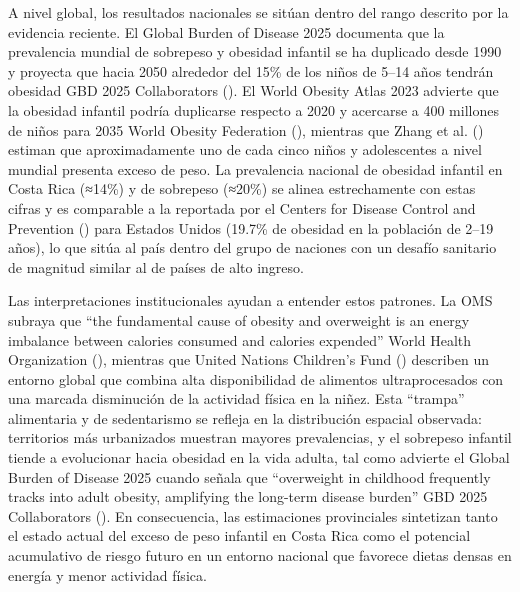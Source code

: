 \documentclass[
]{article}
\begin{document}
A nivel global, los resultados nacionales se sitúan dentro del rango
descrito por la evidencia reciente. El Global Burden of Disease 2025
documenta que la prevalencia mundial de sobrepeso y obesidad infantil se
ha duplicado desde 1990 y proyecta que hacia 2050 alrededor del 15\% de
los niños de 5--14 años tendrán obesidad GBD 2025 Collaborators
(). El World Obesity Atlas 2023 advierte que
la obesidad infantil podría duplicarse respecto a 2020 y acercarse a 400
millones de niños para 2035 World Obesity Federation
(), mientras que Zhang et al.
() estiman que aproximadamente uno de cada
cinco niños y adolescentes a nivel mundial presenta exceso de peso. La
prevalencia nacional de obesidad infantil en Costa Rica (≈14\%) y de
sobrepeso (≈20\%) se alinea estrechamente con estas cifras y es
comparable a la reportada por el Centers for Disease Control and
Prevention () para Estados Unidos (19.7\% de
obesidad en la población de 2--19 años), lo que sitúa al país dentro del
grupo de naciones con un desafío sanitario de magnitud similar al de
países de alto ingreso.

Las interpretaciones institucionales ayudan a entender estos patrones.
La OMS subraya que ``the fundamental cause of obesity and overweight is
an energy imbalance between calories consumed and calories expended''
World Health Organization (), mientras que
United Nations Children's Fund ()
describen un entorno global que combina alta disponibilidad de alimentos
ultraprocesados con una marcada disminución de la actividad física en la
niñez. Esta ``trampa'' alimentaria y de sedentarismo se refleja en la
distribución espacial observada: territorios más urbanizados muestran
mayores prevalencias, y el sobrepeso infantil tiende a evolucionar hacia
obesidad en la vida adulta, tal como advierte el Global Burden of
Disease 2025 cuando señala que ``overweight in childhood frequently
tracks into adult obesity, amplifying the long-term disease burden'' GBD
2025 Collaborators (). En consecuencia, las
estimaciones provinciales sintetizan tanto el estado actual del exceso
de peso infantil en Costa Rica como el potencial acumulativo de riesgo
futuro en un entorno nacional que favorece dietas densas en energía y
menor actividad física.
\end{document}
